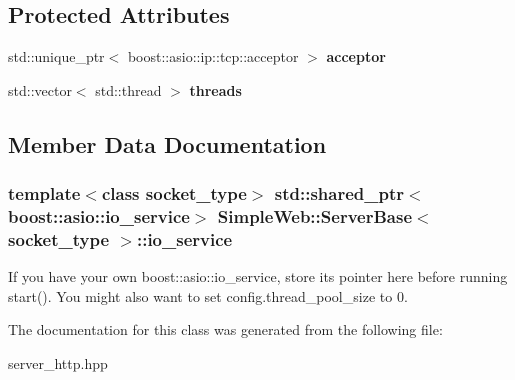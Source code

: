 \subsection*{Protected Attributes}
\begin{DoxyCompactItemize}
\item 
std\+::unique\+\_\+ptr$<$ boost\+::asio\+::ip\+::tcp\+::acceptor $>$ {\bfseries acceptor}\hypertarget{a00270_abe1382243197862e6458b4c1505b6db8}{}\label{a00270_abe1382243197862e6458b4c1505b6db8}

\item 
std\+::vector$<$ std\+::thread $>$ {\bfseries threads}\hypertarget{a00270_aa23ee1c2fa4809d032be37ae7e605249}{}\label{a00270_aa23ee1c2fa4809d032be37ae7e605249}

\end{DoxyCompactItemize}


\subsection{Member Data Documentation}
\subsubsection[{\texorpdfstring{io\+\_\+service}{io\_service}}]{\setlength{\rightskip}{0pt plus 5cm}template$<$class socket\+\_\+type$>$ std\+::shared\+\_\+ptr$<$boost\+::asio\+::io\+\_\+service$>$ {\bf Simple\+Web\+::\+Server\+Base}$<$ socket\+\_\+type $>$\+::io\+\_\+service}\hypertarget{a00270_ae143e11ee462828c80b0397ce06bd320}{}\label{a00270_ae143e11ee462828c80b0397ce06bd320}
If you have your own boost\+::asio\+::io\+\_\+service, store its pointer here before running start(). You might also want to set config.\+thread\+\_\+pool\+\_\+size to 0. 

The documentation for this class was generated from the following file\+:\begin{DoxyCompactItemize}
\item 
server\+\_\+http.\+hpp\end{DoxyCompactItemize}
